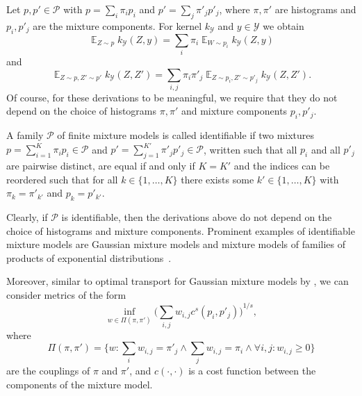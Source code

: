 \documentclass{article}
\DeclareMathOperator{\Exp}{\mathbb{E}}
\begin{document}
Let $p, p' \in \mathcal{P}$ with $p = \sum_i \pi_i p_i$ and
$p' = \sum_j \pi'_j p'_j$, where $\pi, \pi'$ are histograms and $p_i, p'_j$
are the mixture components. For kernel $k_{\mathcal{Y}}$ and $y \in \mathcal{Y}$ we obtain
\begin{equation*}
    \Exp_{Z \sim p} k_{\mathcal{Y}}(Z, y) = \sum_i \pi_i \Exp_{W \sim p_i} k_{\mathcal{Y}}(Z, y)
\end{equation*}
and
\begin{equation*}
    \Exp_{Z \sim p, Z' \sim p'} k_{\mathcal{Y}}(Z, Z') = \sum_{i,j} \pi_i \pi'_j \Exp_{Z \sim p_i, Z' \sim p'_j} k_{\mathcal{Y}}(Z, Z').
\end{equation*}
Of course, for these derivations to be meaningful, we require that they do not depend on the
choice of histograms $\pi, \pi'$ and mixture components $p_i, p'_j$.

\begin{definition}\label{def:identifiable}
    A family $\mathcal{P}$ of finite mixture models is called identifiable if two mixtures
    $p = \sum_{i=1}^{K} \pi_i p_i \in \mathcal{P}$ and $p' = \sum_{j=1}^{K'} \pi'_j p'_j \in \mathcal{P}$,
    written such that all $p_i$ and all $p'_j$ are pairwise distinct, are equal if and only if $K = K'$ and
    the indices can be reordered such that for all $k \in \{1, \ldots, K\}$ there exists
    some $k' \in \{1, \ldots, K\}$ with $\pi_k = \pi'_{k'}$ and $p_k = p'_{k'}$.
\end{definition}

Clearly, if $\mathcal{P}$ is identifiable, then the derivations above do not depend on the choice
of histograms and mixture components. Prominent examples of identifiable mixture models are
Gaussian mixture models and mixture models of families of products of exponential
distributions~\citep{Yakowitz1968}.

Moreover, similar to optimal transport for Gaussian mixture models
by \citet{Delon2019,Chen2019,Chen2020}, we can consider metrics of the form
\begin{equation*}
    \inf_{w \in \Pi(\pi, \pi')} {\bigg(\sum_{i,j} w_{i,j} c^s(p_i, p'_j)\bigg)}^{1/s},
\end{equation*}
where
\begin{equation*}
    \Pi(\pi, \pi') = \bigg\{ w \colon \sum_i w_{i,j} = \pi'_j \land \sum_j w_{i,j} = \pi_i \land \forall i, j \colon w_{i,j} \geq 0\bigg\}
\end{equation*}
are the couplings of $\pi$ and $\pi'$, and $c(\cdot, \cdot)$ is a cost function
between the components of the mixture model.
\end{document}
